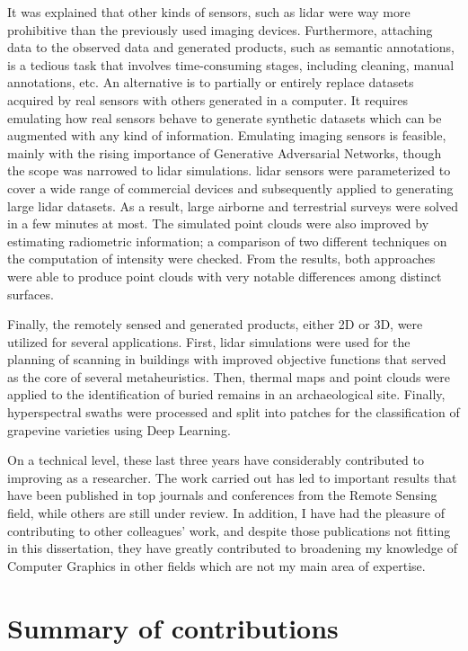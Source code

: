 It was explained that other kinds of sensors, such as \acrshort{lidar} were way more prohibitive than the previously used imaging devices. Furthermore, attaching data to the observed data and generated products, such as semantic annotations, is a tedious task that involves time-consuming stages, including cleaning, manual annotations, etc. An alternative is to partially or entirely replace datasets acquired by real sensors with others generated in a computer. It requires emulating how real sensors behave to generate synthetic datasets which can be augmented with any kind of information. Emulating imaging sensors is feasible, mainly with the rising importance of Generative Adversarial Networks, though the scope was narrowed to \acrshort{lidar} simulations. \acrshort{lidar} sensors were parameterized to cover a wide range of commercial devices and subsequently applied to generating large \acrshort{lidar} datasets. As a result, large airborne and terrestrial surveys were solved in a few minutes at most. The simulated point clouds were also improved by estimating radiometric information; a comparison of two different techniques on the computation of intensity were checked. From the results, both approaches were able to produce point clouds with very notable differences among distinct surfaces. 

Finally, the remotely sensed and generated products, either 2D or 3D, were utilized for several applications. First, \acrshort{lidar} simulations were used for the planning of scanning in buildings with improved objective functions that served as the core of several metaheuristics. Then, thermal maps and point clouds were applied to the identification of buried remains in an archaeological site. Finally, hyperspectral swaths were processed and split into patches for the classification of grapevine varieties using Deep Learning.

On a technical level, these last three years have considerably contributed to improving as a researcher. The work carried out has led to important results that have been published in top journals and conferences from the Remote Sensing field, while others are still under review. In addition, I have had the pleasure of contributing to other colleagues' work, and despite those publications not fitting in this dissertation, they have greatly contributed to broadening my knowledge of Computer Graphics in other fields which are not my main area of expertise. 

\section{Summary of contributions}

